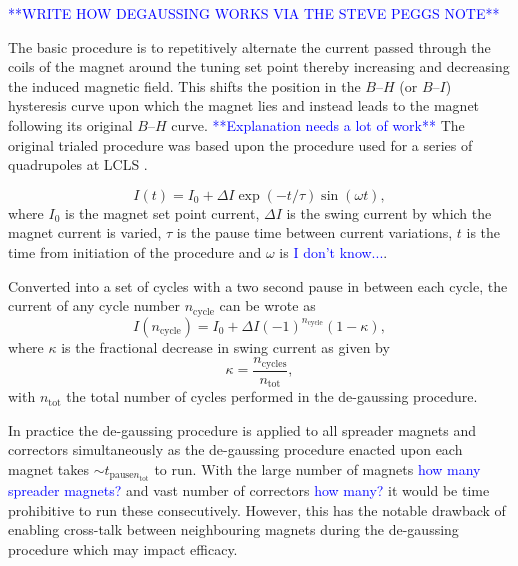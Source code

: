 \documentclass[../main.tex]{subfiles}
\begin{document}
\textcolor{blue}{**WRITE HOW DEGAUSSING WORKS VIA THE STEVE PEGGS NOTE**}

The basic procedure is to repetitively alternate the current passed through the coils of the magnet around the tuning set point thereby increasing and decreasing the induced magnetic field. This shifts the position in the $B$--$H$ (or $B$--$I$) hysteresis curve upon which the magnet lies and instead leads to the magnet following its original $B$--$H$ curve. \textcolor{blue}{**Explanation needs a lot of work**} The original trialed procedure was based upon the procedure used for a series of quadrupoles at LCLS \cite{weidemann2010degaussing}.   

\begin{equation}
I\left(t\right) = I_{0}+\Delta I\exp\left(-t/\tau\right)\sin\left(\omega t\right),
\label{eq:decker_degauss_current}
\end{equation}
where $I_{0}$ is the magnet set point current, $\Delta I$ is the swing current by which the magnet current is varied, $\tau$ is the pause time between current variations, $t$ is the time from initiation of the procedure and $\omega$ is \textcolor{blue}{I don't know...}. 

Converted into a set of cycles with a two second pause in between each cycle, the current of any cycle number $n_{\mathrm{cycle}}$ can be wrote as
\begin{equation}
I\left(n_{\mathrm{cycle}}\right) =  I_{0}+\Delta I\left(-1\right)^{n_{\mathrm{cycle}}}\left(1-\kappa\right),
\label{eq:cycle_degauss_current_fractional}
\end{equation}
where $\kappa$ is the fractional decrease in swing current as given by
\begin{equation}
\kappa = \frac{n_{\mathrm{cycles}}}{n_{\mathrm{tot}}},
\label{eq:fractional_swing_current_decrease}    
\end{equation}
with $n_{\mathrm{tot}}$ the total number of cycles performed in the de-gaussing procedure.

In practice the de-gaussing procedure is applied to all spreader magnets and correctors simultaneously as the de-gaussing procedure enacted upon each magnet takes $\sim t_{\mathrm{pause}n_{\mathrm{tot}}}$ to run. With the large number of magnets \textcolor{blue}{how many spreader magnets?} and vast number of correctors \textcolor{blue}{how many?} it would be time prohibitive to run these consecutively. However, this has the notable drawback of enabling cross-talk between neighbouring magnets during the de-gaussing procedure which may impact efficacy.
\end{document}

